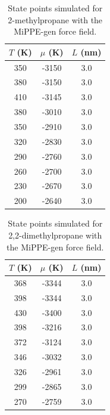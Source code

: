 \documentclass[journal=jctc,manuscript=article]{achemso}
\begin{document}
\begin{table}[htb!]
	\caption{State points simulated for 2-methylpropane with the MiPPE-gen force field.}
	\begin{center}
		\begin{tabular}{|c|c|c|}
			\hline
			$T$ (K) & $\mu$ (K) & $L$ (nm) \\ \hline
			350	&	-3150	&	3.0	\\
			380	&	-3150	&	3.0	\\
			410	&	-3145	&	3.0	\\
			380	&	-3010	&	3.0	\\
			350	&	-2910	&	3.0	\\
			320	&	-2830	&	3.0	\\
			290	&	-2760	&	3.0	\\
			260	&	-2700	&	3.0	\\
			230	&	-2670	&	3.0	\\
			200	&	-2640	&	3.0	\\
			\hline
		\end{tabular}
	\end{center}
\end{table}

\begin{table}[htb!]
	\caption{State points simulated for 2,2-dimethylpropane with the MiPPE-gen force field.}
	\begin{center}
		\begin{tabular}{|c|c|c|}
			\hline
			$T$ (K) & $\mu$ (K) & $L$ (nm) \\ \hline
			368	&	-3344	&	3.0	\\
			398	&	-3344	&	3.0	\\
			430	&	-3400	&	3.0	\\
			398	&	-3216	&	3.0	\\
			372	&	-3124	&	3.0	\\
			346	&	-3032	&	3.0	\\
			326	&	-2961	&	3.0	\\
			299	&	-2865	&	3.0	\\
			270	&	-2759	&	3.0	\\
			\hline
		\end{tabular}
	\end{center}
\end{table}
\end{document}
